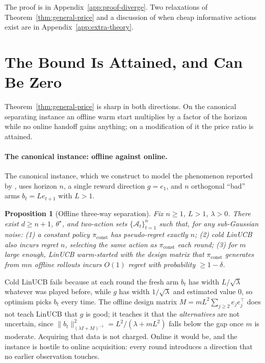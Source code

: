 \documentclass{article}
\newtheorem{proposition}{Proposition}
\theoremstyle{definition}
\theoremstyle{remark}
\theoremstyle{remark}
\begin{document}
The proof is in Appendix~\ref{app:proof-diverge}. Two relaxations of
Theorem~\ref{thm:general-price} and a discussion of when cheap informative
actions exist are in Appendix~\ref{app:extra-theory}.

\section{The Bound Is Attained, and Can Be Zero}
\label{sec:catalog}

Theorem~\ref{thm:general-price} is sharp in both directions. On the
canonical separating instance an offline warm start multiplies by a factor of
the horizon while no online handoff gains anything; on a modification of it
the price ratio is attained.

\paragraph{The canonical instance: offline against online.}
\label{sec:canonical}
The canonical instance, which we construct to model the phenomenon reported
by \cite{chen2024llmdecision}, uses
horizon $n$, a single reward direction $g=e_1$, and $n$ orthogonal ``bad''
arms $b_t=Le_{t+1}$ with $L>1$.

\begin{proposition}[Offline three-way separation]
\label{prop:three-way}
Fix $n\ge1$, $L>1$, $\lambda>0$. There exist $d\ge n+1$, $\theta^\star$, and
two-action sets $\{\mathcal A_t\}_{t=1}^n$ such that, for any sub-Gaussian
noise: (1) a constant policy $\pi_{\mathrm{const}}$ has pseudo-regret exactly
$n$; (2) cold LinUCB also incurs regret $n$, selecting the same action as
$\pi_{\mathrm{const}}$ each round; (3) for $m$ large enough, LinUCB
warm-started with the design matrix that $\pi_{\mathrm{const}}$ generates from
$mn$ \emph{offline} rollouts incurs $O(1)$ regret with probability $\ge1-\delta$.
\end{proposition}

Cold LinUCB fails because at each round the fresh arm $b_t$ has width
$L/\sqrt\lambda$ whatever was played before, while $g$ has width
$1/\sqrt\lambda$ and estimated value $0$, so optimism picks $b_t$ every time.
The offline design matrix $M=mL^2\sum_{j\ge2}e_je_j^\top$ does not teach
LinUCB that $g$ is good; it teaches it that the \emph{alternatives} are not
uncertain, since $\|b_t\|^2_{(\lambda I+M)^{-1}}=L^2/(\lambda+mL^2)$ falls
below the gap once $m$ is moderate. Acquiring that data is not charged.
Online it would be, and the instance is hostile to online acquisition: every
round introduces a direction that no earlier observation touches.
\end{document}
